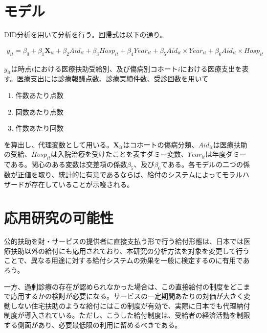 \documentclass{jsarticle}[12pt]
\begin{document}
\section{モデル}

DID分析を用いて分析を行う。回帰式は以下の通り。

 \begin{align*}
 y_{it} = \beta_0 + \beta_1 \mathbf{X}_{it} + \beta_2 \textit{Aid}_{it} + \beta_3 \textit{Hosp}_{it} +
 \beta_4 \textit{Year}_{it} + \beta_5 \textit{Aid}_{it} \times \textit{Year}_{it} + \beta_6 \textit{Aid}_{it} \times \textit{Hosp}_{it} 
 \end{align*}

$y_{it}$は時点$t$における医療扶助受給別、及び傷病別コホート$i$における医療支出を表す。医療支出には診療報酬点数、診療実績件数、受診回数を用いて

 \begin{enumerate}
 
 \item 件数あたり点数
 
 \item 回数あたり点数
 
 \item 件数あたり回数
 
 \end{enumerate}

を算出し、代理変数として用いる。$\mathbf{X}_{it}$はコホートの傷病分類、$\textit{Aid}_{it}$は医療扶助の受給、$\textit{Hosp}_{it}$は入院治療を受けたことを表すダミー変数、$\textit{Year}_{it}$は年度ダミーである。関心のある変数は交差項の係数$\beta_5$、及び$\beta_6$である。各モデルの二つの係数が正値を取り、統計的に有意であるならば、給付のシステムによってモラルハザードが存在していることが示唆される。

\section{応用研究の可能性}

公的扶助を財・サービスの提供者に直接支払う形で行う給付形態は、日本では医療扶助以外の給付にも応用されており、本研究の分析方法を対象を変更して行うことで、異なる用途に対する給付システムの効果を一般に検定するのに有用であろう。

一方、過剰診療の存在が認められなかった場合は、この直接給付の制度をどこまで応用するかの検討が必要になる。サービスの一定期間あたりの対価が大きく変動しない住宅扶助のような給付にはこの制度が有効で、実際に日本でも代理納付制度が導入されている。ただし、こうした給付制度は、受給者の経済活動を制限する側面があり、必要最低限の利用に留めるべきである。
\end{document}

